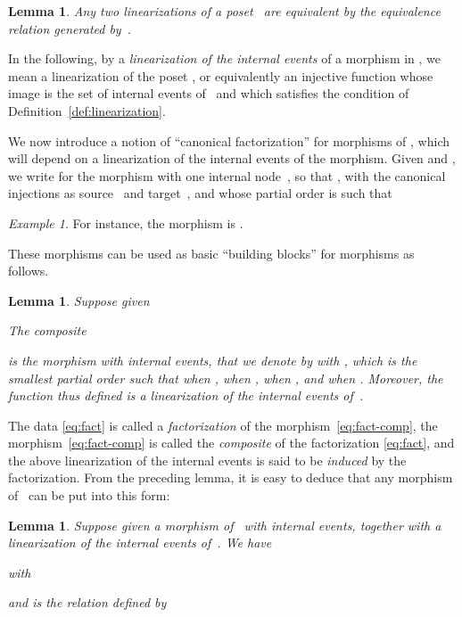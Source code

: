 \documentclass[submission,copyright,creativecommons]{eptcs}
\newtheorem{lemma}[theorem]{Lemma}
\theoremstyle{definition}
\theoremstyle{remark}
\newtheorem{example}[theorem]{Example}
\begin{document}
\begin{lemma}
  \label{lemma:lin-swap}
  Any two linearizations of a poset~ are equivalent by the equivalence
  relation generated by~.
\end{lemma}

\noindent
In the following, by a \emph{linearization of the internal events} of a morphism
 in , we mean a linearization of the poset
, or equivalently an
injective function  whose image is the set of internal
events of~ and which satisfies the condition of
Definition~\ref{def:linearization}.

We now introduce a notion of ``canonical factorization'' for morphisms of ,
which will depend on a linearization of the internal events of the morphism.
Given  and , we write  for the morphism
with one internal node~, so that
, with the canonical injections as
source~ and target~, and whose partial order
is such that



\begin{example}
  \label{ex:X302}
  For instance, the morphism  is
  .
\end{example}

\noindent
These morphisms can be used as basic ``building blocks'' for morphisms as follows.

\begin{lemma}
  \label{lemma:poset-cf-comp}
  Suppose given
  
  The composite
  
  is the morphism  with  internal events, that we denote by
   with , which is the smallest partial order such that
   when ,  when ,  when
  , and  when . Moreover, the function
   thus defined is a linearization of the internal
  events of~.
\end{lemma}

\noindent
The data \eqref{eq:fact} is called a \emph{factorization} of the
morphism~\eqref{eq:fact-comp}, the morphism~\eqref{eq:fact-comp} is called the
\emph{composite} of the factorization \eqref{eq:fact}, and the above
linearization of the internal events is said to be \emph{induced} by the
factorization. From the preceding lemma, it is easy to deduce that any morphism
of~ can be put into this form:

\begin{lemma}
  \label{lemma:poset-cf-fact}
  Suppose given a morphism  of~ with  internal events,
  together with a linearization  of the internal
  events of~. We have
  
  with
  
  and  is the relation defined by
  
\end{lemma}
\end{document}
